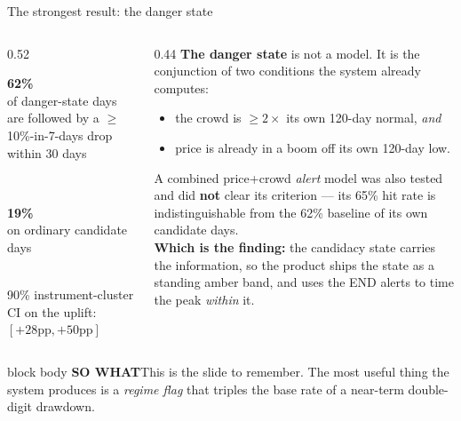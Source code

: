 \documentclass[aspectratio=169,11pt]{beamer}
\newcommand{\sowhatfont}{\footnotesize}
\newcommand{\sowhat}[1]{%
  \vspace{0.3em}
  \begin{beamercolorbox}[wd=\linewidth,sep=0.55em]{block body}
    {\sowhatfont\textbf{\color{gicnavy}SO WHAT}\quad #1}
  \end{beamercolorbox}}
\newcommand{\stat}[3][0.235]{%
  \begin{minipage}[t]{#1\linewidth}
    {\color{gicnavy}\fontsize{22}{24}\selectfont\bfseries #2}\\[0.15em]
    {\color{giclight}\scriptsize #3}
  \end{minipage}}
\begin{document}
\begin{frame}{The strongest result: the danger state}
  \begin{columns}[T]
    \begin{column}{0.52\linewidth}
      \vspace{0.4em}
      \stat[0.95]{62\%}{of danger-state days are followed by a $\geq$10\%-in-7-days
        drop within 30 days}\\[1.0em]
      \stat[0.95]{19\%}{on ordinary candidate days}\\[1.0em]
      {\scriptsize 90\% instrument-cluster CI on the uplift:
       $[+28\text{pp}, +50\text{pp}]$}
    \end{column}
    \begin{column}{0.44\linewidth}
      \scriptsize
      \textbf{The danger state} is not a model. It is the conjunction of two
      conditions the system already computes:
      \begin{itemize}
        \item the crowd is $\geq 2\times$ its own 120-day normal, \emph{and}
        \item price is already in a boom off its own 120-day low.
      \end{itemize}
      \vspace{0.5em}
      A combined price+crowd \emph{alert} model was also tested and did
      \textbf{not} clear its criterion --- its 65\% hit rate is
      indistinguishable from the 62\% baseline of its own candidate days.
      \vspace{0.4em}
      \\ \textbf{Which is the finding:} the candidacy state carries the
      information, so the product ships the state as a standing amber band,
      and uses the END alerts to time the peak \emph{within} it.
    \end{column}
  \end{columns}
  \sowhat{This is the slide to remember. The most useful thing the system
    produces is a \emph{regime flag} that triples the base rate of a
    near-term double-digit drawdown.}
\end{frame}

\end{document}
